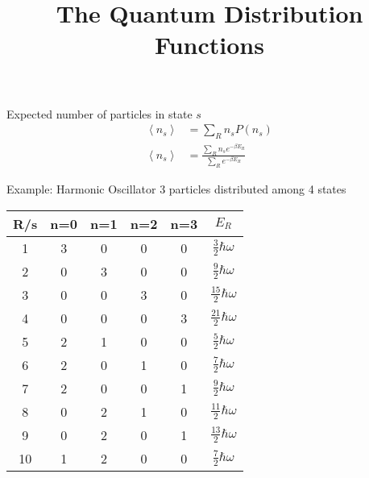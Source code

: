 \documentclass{beamer}
\title{The Quantum Distribution Functions}
\begin{document}
\begin{frame}[plain]
    \maketitle
\end{frame}
\begin{frame}{Expected number of particles in state $s$}
	\begin{align*}
		\left<n_s\right>&=\sum_{R}n_sP(n_s)\\
		\left<n_s\right>&=\frac{\sum_{R}n_se^{-\beta E_R}}{\sum_{R}e^{-\beta E_R}}
	\end{align*}
\end{frame}



\begin{frame}{Example: Harmonic Oscillator}
	3 particles distributed among 4 states
	\renewcommand{\arraystretch}{1.5}
	\centering
	\begin{tabular}{|c|c|c|c|c|c|}
		\hline
		R/s&n=0&n=1&n=2&n=3&$E_R$\\
		\hline
		1&3&0&0&0&$\frac{3}{2}\hbar\omega$\\
		\hline
		2&0&3&0&0&$\frac{9}{2}\hbar\omega$\\
		\hline
		3&0&0&3&0&$\frac{15}{2}\hbar\omega$\\
		\hline
		4&0&0&0&3&$\frac{21}{2}\hbar\omega$\\
		\hline
		5&2&1&0&0&$\frac{5}{2}\hbar\omega$\\
		\hline
		6&2&0&1&0&$\frac{7}{2}\hbar\omega$\\
		\hline
		7&2&0&0&1&$\frac{9}{2}\hbar\omega$\\
		\hline
		8&0&2&1&0&$\frac{11}{2}\hbar\omega$\\
		\hline
		9&0&2&0&1&$\frac{13}{2}\hbar\omega$\\
		\hline
		10&1&2&0&0&$\frac{7}{2}\hbar\omega$\\
		\hline
	\end{tabular}
\end{frame}
\end{document}
